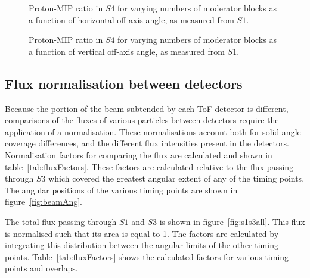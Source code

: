 \begin{figure}[!ht]
  \begin{minipage}[t]{0.48\textwidth}
    \begin{adjustbox}{max totalsize={\textwidth}{.35\textheight}, center}
      
    \end{adjustbox}
    \caption{Proton-MIP ratio in $\mathit{S4}$ for varying numbers of moderator blocks as a function of horizontal off-axis angle, as measured from $\mathit{S1}$.}
    \label{fig:propiratio_s4_horz}
  \end{minipage}
  \hspace{0.3cm}
  \begin{minipage}[t]{0.48\textwidth}
    \begin{adjustbox}{max totalsize={\textwidth}{.35\textheight}, center}
      
    \end{adjustbox}
    \caption{Proton-MIP ratio in $\mathit{S4}$ for varying numbers of moderator blocks as a function of vertical off-axis angle, as measured from $\mathit{S1}$.}
    \label{fig:propiratio_s4_vert}
  \end{minipage}	
\end{figure}

\subsection{Flux normalisation between detectors}

Because the portion of the beam subtended by each ToF detector is different, comparisons of the fluxes of various particles between detectors require the application of a normalisation.
These normalisations account both for solid angle coverage differences, and the different flux intensities present in the detectors.
Normalisation factors for comparing the flux are calculated and shown in table~\ref{tab:fluxFactors}.
These factors are calculated relative to the flux passing through $\mathit{S3}$ which covered the greatest angular extent of any of the timing points. 
The angular positions of the various timing points are shown in figure~\ref{fig:beamAng}.

\begin{figure}[h]
  
\end{figure}

The total flux passing through $\mathit{S1}$ and $\mathit{S3}$ is shown in figure~\ref{fig:s1s3all}.
This flux is normalised such that its area is equal to 1.
The factors are calculated by integrating this distribution between the angular limits of the other timing points.
Table~\ref{tab:fluxFactors} shows the calculated factors for various timing points and overlaps.

